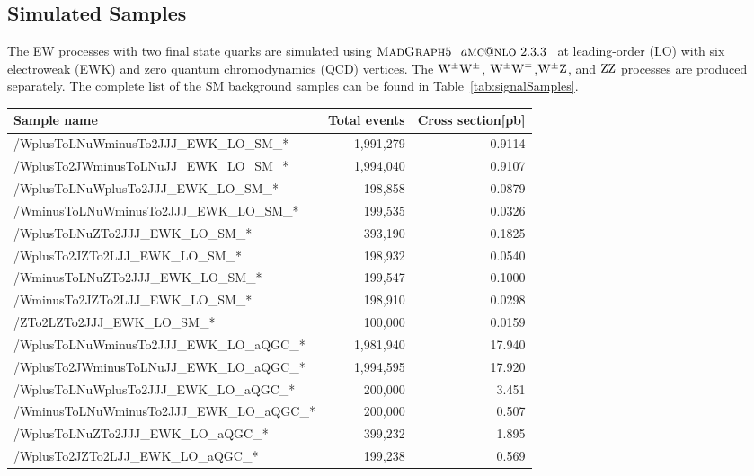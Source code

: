 \subsection{Simulated Samples}
The EW  processes with two final state quarks are simulated using \newline $\textsc{MadGraph}{}5\_a\textsc{mc}@\textsc{nlo}~2.3.3$~\cite{Alwall:2014} at leading-order (LO) with six electroweak (EWK) and zero quantum chromodynamics (QCD) vertices. The $\mathrm{W}^{\pm}\mathrm{W}^{\pm}$, $\mathrm{W}^{\pm}\mathrm{W}^{\mp}$,$\mathrm{W}^{\pm}\mathrm{Z}$, and $\mathrm{Z}\mathrm{Z}$ processes are produced separately. The complete list of the SM background samples can be found in Table~\ref{tab:signalSamples}.
%
\begin{table}[!htbp]
\footnotesize
\centering
\begin{tabular}{lrr}
\textbf{Sample name} & \textbf{Total events} & \textbf{Cross section[pb]} \\
\hline
/WplusToLNuWminusTo2JJJ\_{}EWK\_{}LO\_{}SM\_{}* & 1,991,279 & 0.9114\\
/WplusTo2JWminusToLNuJJ\_{}EWK\_{}LO\_{}SM\_{}* & 1,994,040 & 0.9107\\
/WplusToLNuWplusTo2JJJ\_{}EWK\_{}LO\_{}SM\_{}*  & 198,858   & 0.0879\\
/WminusToLNuWminusTo2JJJ\_{}EWK\_{}LO\_{}SM\_{}*  & 199,535   & 0.0326\\
/WplusToLNuZTo2JJJ\_{}EWK\_{}LO\_{}SM\_{}*    & 393,190   & 0.1825\\
/WplusTo2JZTo2LJJ\_{}EWK\_{}LO\_{}SM\_{}*     & 198,932   & 0.0540\\
/WminusToLNuZTo2JJJ\_{}EWK\_{}LO\_{}SM\_{}*   & 199,547   & 0.1000\\
/WminusTo2JZTo2LJJ\_{}EWK\_{}LO\_{}SM\_{}*    & 198,910   & 0.0298\\
/ZTo2LZTo2JJJ\_{}EWK\_{}LO\_{}SM\_{}*       & 100,000   & 0.0159\\
\hline
\hline
/WplusToLNuWminusTo2JJJ\_{}EWK\_{}LO\_{}aQGC\_{}* & 1,981,940 & 17.940\\
/WplusTo2JWminusToLNuJJ\_{}EWK\_{}LO\_{}aQGC\_{}* & 1,994,595 & 17.920\\
/WplusToLNuWplusTo2JJJ\_{}EWK\_{}LO\_{}aQGC\_{}*  & 200,000   & 3.451\\
/WminusToLNuWminusTo2JJJ\_{}EWK\_{}LO\_{}aQGC\_{}*& 200,000   & 0.507\\
/WplusToLNuZTo2JJJ\_{}EWK\_{}LO\_{}aQGC\_{}*    & 399,232   & 1.895\\
/WplusTo2JZTo2LJJ\_{}EWK\_{}LO\_{}aQGC\_{}*   & 199,238   & 0.569\\

\end{tabular}
\end{table}
